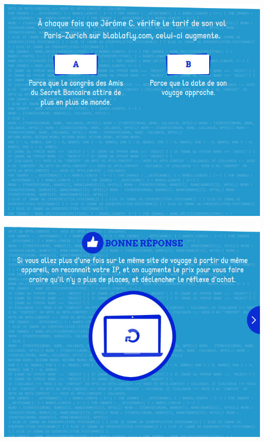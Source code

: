 \documentclass{beamer}
\begin{document}
\begin{frame}\includegraphics[scale=0.6] {./images/Quizz_HygieneNumerique_France4_2.jpg} \end{frame}
\begin{frame}\includegraphics[scale=0.6] {./images/Quizz_HygieneNumerique_France4_3.jpg} \end{frame}
\end{document}
